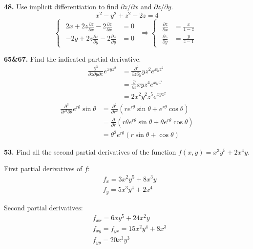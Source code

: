 \documentclass[a4paper,12pt]{article}
\newcommand{\tho}[3][]{\frac{\partial #1 #2}{\partial #3 #1}}
\newcommand{\exercise}[1]{\noindent\textbf{#1.}}
\begin{document}
\exercise{48} Use implicit differentiation to find $\partial z/\partial x$
and $\partial z/\partial y$.
\[x^2 - y^2 + z^2 - 2z = 4\]
\begin{equation*}
  \begin{cases}
    \begin{aligned}
      2x + 2z\tho{z}{x} - 2\tho{z}{x} &= 0\\
      -2y + 2z\tho{z}{y} - 2\tho{z}{y} &= 0
    \end{aligned}
  \end{cases}
  \Longrightarrow
  \begin{cases}
    \begin{aligned}
      \tho{z}{x} &= \frac{x}{1 - z}\\
      \tho{z}{y} &= \frac{y}{z - 1}
    \end{aligned}
  \end{cases}
\end{equation*}

\exercise{65\&67} Find the indicated partial derivative.
\begin{align*}
   \frac{\partial^3}{\partial z\partial y\partial x}e^{xyz^2}
&= \frac{\partial^2}{\partial z\partial y}yz^2e^{xyz^2}\\
&= \frac{\partial}{\partial z}xyz^4e^{xyz^2}\\
&= 2x^2y^2z^5e^{xyz^2}\tag{65}
\end{align*}
\begin{align*}
   \frac{\partial^3}{\partial r^2\partial\theta}e^{r\theta}\sin\theta
&= \frac{\partial^2}{\partial r^2}
   \left(re^{r\theta}\sin\theta + e^{r\theta}\cos\theta\right)\\
&= \frac{\partial}{\partial r}
   \left(r\theta e^{r\theta}\sin\theta + \theta e^{r\theta}\cos\theta\right)\\
&= \theta^2e^{r\theta}(r\sin\theta + \cos\theta)\tag{67}
\end{align*}

\exercise{53} Find all the second partial derivatives of the function
$f(x, y) = x^3 y^5 + 2x^4 y$.

First partial derivatives of $f$:
\begin{align*}
  &f_x = 3x^2 y^5 + 8x^3 y\\
  &f_y = 5x^3 y^4 + 2x^4
\end{align*}

Second partial derivatives:
\begin{align*}
  &f_{xx} = 6xy^5 + 24x^2 y\\
  &f_{xy} = f_{yx} = 15x^2 y^4 + 8x^3\\
  &f_{yy} = 20x^3 y^3
\end{align*}
\end{document}
